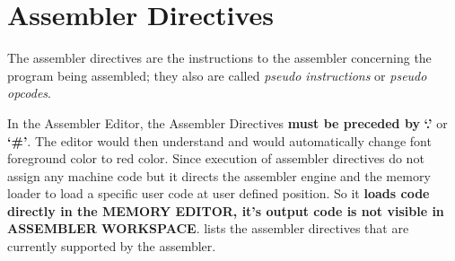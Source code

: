 \chapter{Assembler Directives}
The assembler directives\cite{intel} are the instructions to the assembler concerning the program being assembled; they also are called \textit{pseudo instructions} or \textit{pseudo opcodes}.

In the Assembler Editor, the Assembler Directives \textbf{must be
preceded by }\textbf{`.'} or \textbf{`\#'}. The editor would then understand and would automatically change font foreground color to red color. Since execution of assembler directives do not assign any machine code but it directs the assembler engine and the memory loader to load a specific user code at user defined position. So it \textbf{loads code directly in the MEMORY EDITOR, it's output code is not visible in ASSEMBLER WORKSPACE}.  lists the assembler directives that are currently supported by the assembler.

